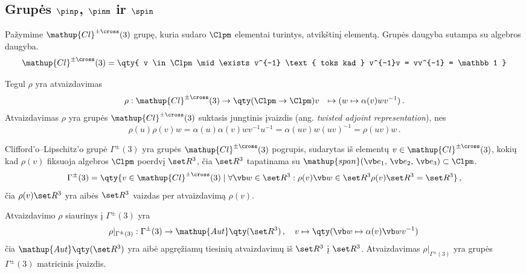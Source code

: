 
\subsection{Grupės \texorpdfstring{$\pinp$}{Pin+(3)}, \texorpdfstring{$\pinm$}{Pin-(3)} ir \texorpdfstring{$\spin$}{Spin(3)}}

Pažymime $\mathup{Cl}^{\pm\cross}(3)$ grupę,
kuria sudaro $\Clpm$ elementai turintys, atvikštinį elementą.
Grupės daugyba sutampa su algebros daugyba. 
\begin{equation}
	\mathup{Cl}^{\pm\cross}(3)
	= \qty{
		v \in \Clpm
		\mid
		\exists v^{-1}
		\text{ toks kad }
		v^{-1}v = vv^{-1} = \mathbb1
	} 
\end{equation}

\begin{definition}
	Tegul $\rho$ yra atvaizdavimas
	\begin{equation}
		\begin{aligned}
			\rho: \mathup{Cl}^{\pm\cross}(3) &\to \qty( \Clpm \to \Clpm )
			v &\mapsto (w \mapsto \alpha(v) w v^{-1})
			\,.
		\end{aligned}
	\end{equation}
	Atvaizdavimas $\rho$ yra grupės $\mathup{Cl}^{\pm\cross}(3)$
	suktasis jungtinis įvaizdis (ang. \emph{twisted adjoint representation}),
	nes
	\begin{equation}
		\rho(u)\rho(v)w 
		= \alpha(u)\alpha(v)wv^{-1}u^{-1}
		= \alpha(uv)w(uv)^{-1}
		= \rho(uv)w
		\,.
	\end{equation}
\end{definition}

\begin{definition}
	Clifford'o–Lipschitz'o grupė $\Gamma^\pm(3)$ yra grupės
	$\mathup{Cl}^{\pm\cross}(3)$ pogrupis,
	sudarytas iš elementų $v \in \mathup{Cl}^{\pm\cross}(3)$,
	kokių kad $\rho(v)$ fiksuoja algebros $\Clpm$ poerdvį $\set R^3$,
	čia $\set R^3$ tapatinama su
	$\mathup{span}(\vb e_1,\,\vb e_2,\,\vb e_3) \subset \Clpm$.
	\begin{equation}
		\Gamma^\pm(3) = \qty{
			v \in \mathup{Cl}^{\pm\cross}(3)
			\mid
			\forall \vb w \in \set R^3 : \rho(v) \vb w \in \set R^3  
			\rho(v) \set R^3 = \set R^3  
		}
		\,,
	\end{equation}
	čia $\rho(v) \set R^3$ yra aibės $\set R^3$ vaizdas per atvaizdavimą $\rho(v)$.
\end{definition}

\begin{remark}
	Atvaizdavimo $\rho$ siaurinys į $\Gamma^\pm(3)$ yra
	\begin{equation}
		\rho |_{\Gamma^\pm(3)} : \Gamma^\pm(3) \to \mathup{Aut}\qty(\set R^3)
		\,,\quad
		v \mapsto \qty(\vb w \mapsto \alpha(v) \vb w v^{-1})
		\,
	\end{equation}
	čia $\mathup{Aut}\qty(\set R^3)$
	yra aibė apgręžiamų tiesinių atvaizdavimų iš $\set R^3$ į $\set R^3$.
	Atvaizdavimas $\rho |_{\Gamma^\pm(3)}$
	yra grupės $\Gamma^\pm(3)$ matricinis įvaizdis.
\end{remark}

